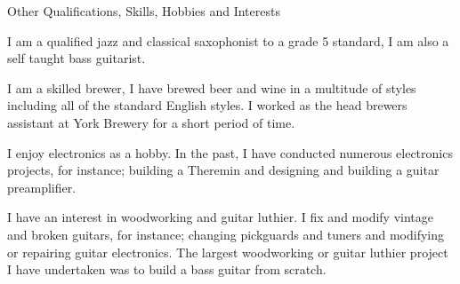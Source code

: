 \documentclass{cv}
\begin{document}
\begin{rSection}{Other Qualifications, Skills, Hobbies and Interests}

\item I am a qualified jazz and classical saxophonist to a grade 5 standard, I am also a self taught  bass guitarist.

\item I am a skilled brewer, I have brewed beer and wine in a multitude of styles including all of the standard English styles. I worked as the head brewers assistant at York Brewery for a short period of time.

\item I enjoy electronics as a hobby. In the past, I have conducted numerous electronics projects, for instance; building a Theremin and designing and building a guitar preamplifier.

\item I have an interest in woodworking and guitar luthier. I fix and modify vintage and broken guitars, for instance; changing pickguards and tuners and modifying or repairing guitar electronics. The largest woodworking or guitar luthier project I have undertaken was to build a bass guitar from scratch.

\end{rSection}
\end{document}
